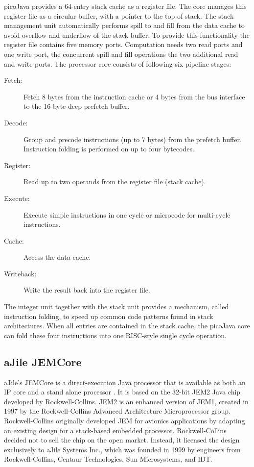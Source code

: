 picoJava provides a 64-entry stack cache as a register file. The core
manages this register file as a circular buffer, with a pointer to
the top of stack. The stack management unit automatically performs
spill to and fill from the data cache to avoid overflow and underflow
of the stack buffer. To provide this functionality the register file
contains five memory ports. Computation needs two read ports and one
write port, the concurrent spill and fill operations the two
additional read and write ports. The processor core consists of
following six pipeline stages:
%
\begin{description}

\item[Fetch:]
Fetch 8 bytes from the instruction cache or 4 bytes from the bus
interface to the 16-byte-deep prefetch buffer.

\item[Decode:]
Group and precode instructions (up to 7 bytes) from the prefetch
buffer. Instruction folding is performed on up to four bytecodes.

\item[Register:]
Read up to two operands from the register file (stack cache).

\item[Execute:]
Execute simple instructions in one cycle or microcode for
multi-cycle instructions.

\item[Cache:]
Access the data cache.

\item[Writeback:]
Write the result back into the register file.

\end{description}
%
The integer unit together with the stack unit provides a mechanism,
called instruction folding, to speed up common code patterns found in
stack architectures. When all entries are contained in the stack
cache, the picoJava core can fold these four instructions into one
RISC-style single cycle operation.


\subsection{aJile JEMCore} 

aJile's JEMCore is a direct-execution Java processor that is
available as both an IP core and a stand alone processor \cite{aJile,
aJile:paper}. It is based on the 32-bit JEM2 Java chip developed by
Rockwell-Collins. JEM2 is an enhanced version of JEM1, created in
1997 by the Rockwell-Collins Advanced Architecture Microprocessor
group. Rockwell-Collins originally developed JEM for avionics
applications by adapting an existing design for a stack-based
embedded processor. Rockwell-Collins decided not to sell the chip on
the open market. Instead, it licensed the design exclusively to aJile
Systems Inc., which was founded in 1999 by engineers from
Rockwell-Collins, Centaur Technologies, Sun Microsystems, and IDT.

